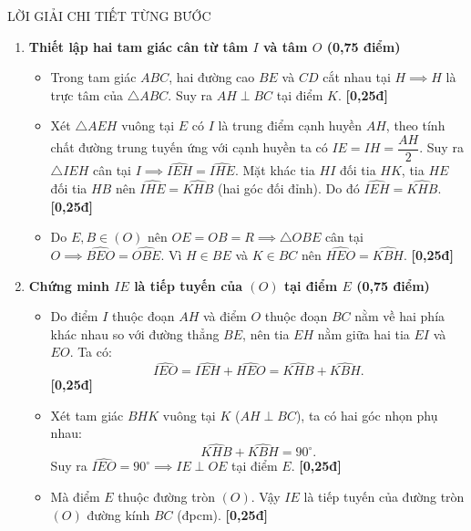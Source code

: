 \documentclass[11pt,a4paper]{article}
\begin{document}
\begin{solutionbox}{LỜI GIẢI CHI TIẾT TỪNG BƯỚC}
\begin{enumerate}[label=\textbf{\arabic*.}, leftmargin=*]
    \vspace{1mm}
    \item \textbf{Thiết lập hai tam giác cân từ tâm $I$ và tâm $O$ (0,75 điểm)}
    \begin{itemize}[leftmargin=*, nosep]
        \item Trong tam giác $ABC$, hai đường cao $BE$ và $CD$ cắt nhau tại $H \implies H$ là trực tâm của $\triangle ABC$. Suy ra $AH \perp BC$ tại điểm $K$. \hfill \textbf{[0,25đ]}
        \item Xét $\triangle AEH$ vuông tại $E$ có $I$ là trung điểm cạnh huyền $AH$, theo tính chất đường trung tuyến ứng với cạnh huyền ta có $IE = IH = \dfrac{AH}{2}$.
        Suy ra $\triangle IEH$ cân tại $I \implies \widehat{IEH} = \widehat{IHE}$.
        Mặt khác tia $HI$ đối tia $HK$, tia $HE$ đối tia $HB$ nên $\widehat{IHE} = \widehat{KHB}$ (hai góc đối đỉnh). Do đó $\widehat{IEH} = \widehat{KHB}$. \hfill \textbf{[0,25đ]}
        \item Do $E, B \in (O)$ nên $OE = OB = R \implies \triangle OBE$ cân tại $O \implies \widehat{BEO} = \widehat{OBE}$.
        Vì $H \in BE$ và $K \in BC$ nên $\widehat{HEO} = \widehat{KBH}$. \hfill \textbf{[0,25đ]}
    \end{itemize}

    \vspace{1mm}
    \item \textbf{Chứng minh $IE$ là tiếp tuyến của $(O)$ tại điểm $E$ (0,75 điểm)}
    \begin{itemize}[leftmargin=*, nosep]
        \item Do điểm $I$ thuộc đoạn $AH$ và điểm $O$ thuộc đoạn $BC$ nằm về hai phía khác nhau so với đường thẳng $BE$, nên tia $EH$ nằm giữa hai tia $EI$ và $EO$. Ta có:
        \[
        \widehat{IEO} = \widehat{IEH} + \widehat{HEO} = \widehat{KHB} + \widehat{KBH}.
        \] \hfill \textbf{[0,25đ]}
        \item Xét tam giác $BHK$ vuông tại $K$ ($AH \perp BC$), ta có hai góc nhọn phụ nhau:
        \[
        \widehat{KHB} + \widehat{KBH} = 90^\circ.
        \]
        Suy ra $\widehat{IEO} = 90^\circ \implies IE \perp OE$ tại điểm $E$. \hfill \textbf{[0,25đ]}
        \item Mà điểm $E$ thuộc đường tròn $(O)$. Vậy $IE$ là tiếp tuyến của đường tròn $(O)$ đường kính $BC$ (đpcm). \hfill \textbf{[0,25đ]}
    \end{itemize}
\end{enumerate}
\end{solutionbox}
\end{document}
